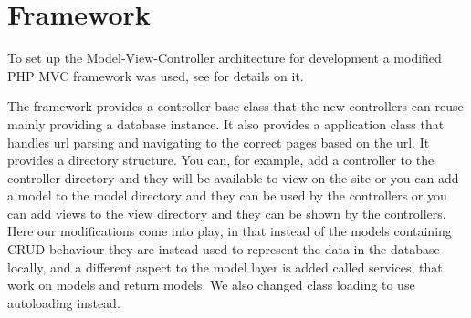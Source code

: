 \section{Framework}
To set up the Model-View-Controller architecture for development a modified PHP MVC framework was used, see \citep{misc:mvc-framework} for details on it.

The framework provides a controller base class that the new controllers can reuse mainly providing a database instance.
It also provides a application class that handles url parsing and navigating to the correct pages based on the url.
It provides a directory structure. 
You can, for example, add a controller to the controller directory and they will be available to view on the site or you can add a model to the model directory and they can be used by the controllers or you can add views to the view directory and they can be shown by the controllers.
Here our modifications come into play, in that instead of the models containing CRUD behaviour they are instead used to represent the data in the database locally, and a different aspect to the model layer is added called services, that work on models and return models.
We also changed class loading to use autoloading instead.

